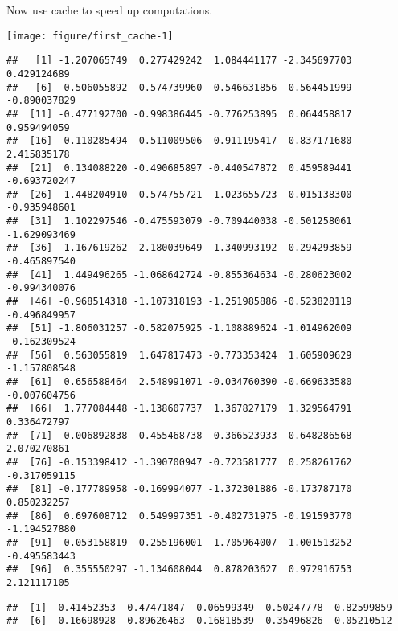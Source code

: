 \documentclass{article}\usepackage[]{graphicx}\usepackage[]{color}
\makeatletter
\def\maxwidth{ %
  \ifdim\Gin@nat@width>\linewidth
    \linewidth
  \else
    \Gin@nat@width
  \fi
}
\newenvironment{kframe}{%
 \def\at@end@of@kframe{}%
 \ifinner\ifhmode%
  \def\at@end@of@kframe{\end{minipage}}%
  \begin{minipage}{\columnwidth}%
 \fi\fi%
 \def\FrameCommand##1{\hskip\@totalleftmargin \hskip-\fboxsep
 \colorbox{shadecolor}{##1}\hskip-\fboxsep
     \hskip-\linewidth \hskip-\@totalleftmargin \hskip\columnwidth}%
 \MakeFramed {\advance\hsize-\width
   \@totalleftmargin\z@ \linewidth\hsize
   \@setminipage}}%
 {\par\unskip\endMakeFramed%
 \at@end@of@kframe}
\newenvironment{knitrout}{}{} %
\makeatother
\begin{document}
Now use cache to speed up computations.

\begin{knitrout}
\color{fgcolor}
\texttt{[image: figure/first\_cache-1]} 

\end{knitrout}

\begin{knitrout}
\color{fgcolor}\begin{kframe}
\begin{verbatim}
##   [1] -1.207065749  0.277429242  1.084441177 -2.345697703  0.429124689
##   [6]  0.506055892 -0.574739960 -0.546631856 -0.564451999 -0.890037829
##  [11] -0.477192700 -0.998386445 -0.776253895  0.064458817  0.959494059
##  [16] -0.110285494 -0.511009506 -0.911195417 -0.837171680  2.415835178
##  [21]  0.134088220 -0.490685897 -0.440547872  0.459589441 -0.693720247
##  [26] -1.448204910  0.574755721 -1.023655723 -0.015138300 -0.935948601
##  [31]  1.102297546 -0.475593079 -0.709440038 -0.501258061 -1.629093469
##  [36] -1.167619262 -2.180039649 -1.340993192 -0.294293859 -0.465897540
##  [41]  1.449496265 -1.068642724 -0.855364634 -0.280623002 -0.994340076
##  [46] -0.968514318 -1.107318193 -1.251985886 -0.523828119 -0.496849957
##  [51] -1.806031257 -0.582075925 -1.108889624 -1.014962009 -0.162309524
##  [56]  0.563055819  1.647817473 -0.773353424  1.605909629 -1.157808548
##  [61]  0.656588464  2.548991071 -0.034760390 -0.669633580 -0.007604756
##  [66]  1.777084448 -1.138607737  1.367827179  1.329564791  0.336472797
##  [71]  0.006892838 -0.455468738 -0.366523933  0.648286568  2.070270861
##  [76] -0.153398412 -1.390700947 -0.723581777  0.258261762 -0.317059115
##  [81] -0.177789958 -0.169994077 -1.372301886 -0.173787170  0.850232257
##  [86]  0.697608712  0.549997351 -0.402731975 -0.191593770 -1.194527880
##  [91] -0.053158819  0.255196001  1.705964007  1.001513252 -0.495583443
##  [96]  0.355550297 -1.134608044  0.878203627  0.972916753  2.121117105
\end{verbatim}
\end{kframe}
\end{knitrout}

\begin{knitrout}
\color{fgcolor}\begin{kframe}
\begin{verbatim}
##  [1]  0.41452353 -0.47471847  0.06599349 -0.50247778 -0.82599859
##  [6]  0.16698928 -0.89626463  0.16818539  0.35496826 -0.05210512
\end{verbatim}
\end{kframe}
\end{knitrout}
\end{document}

